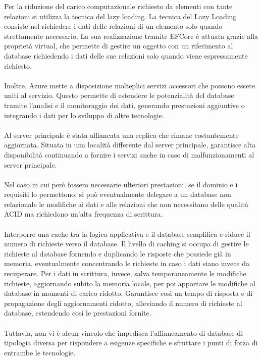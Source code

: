 Per la riduzione del carico computazionale richiesto da elementi con tante relazioni si utilizza la tecnica del lazy loading.
La tecnica del Lazy Loading consiste nel richiedere i dati delle relazioni di un elemento solo quando strettamente necessario.
La sua realizzazione tramite EFCore è attuata grazie alla proprietà virtual,
che permette di gestire un oggetto con un riferimento al database richiedendo i dati delle sue relazioni solo quando viene espressamente richiesto.\\
\\


Inoltre, Azure mette a disposizione molteplici servizi accessori che possono essere uniti al servizio.
Questo permette di estendere le potenzialità del database tramite  l’analisi e il monitoraggio dei dati,
generando prestazioni aggiuntive o integrando i dati per lo sviluppo di altre tecnologie.\\
\\

Al server principale è stata affiancata una replica che rimane costantemente aggiornata.
Situata in una località differente dal server principale,
garantisce alta disponibilità continuando a fornire i servizi anche in caso di malfunzionamenti al server principale.\\
\\

Nel caso in cui però fossero necessarie ulteriori prestazioni,
se il dominio e i requisiti lo permettono,
si può eventualmente delegare a un database non relazionale le modifiche ai dati e alle relazioni
che non necessitano delle qualità ACID ma richiedono un’alta frequenza di scrittura.\\
\\
Interporre una cache tra la logica applicativa e il database
semplifica e riduce il numero di richieste verso il database.
Il livello di caching si occupa di gestire le richieste al database
fornendo e duplicando le risposte che possiede già in memoria,
eventualmente concentrando le richieste in caso i dati siano invece da recuperare.
Per i dati in scrittura, invece, salva temporaneamente le modifiche richieste,
aggiornando subito la memoria locale,
per poi apportare le modifiche al database in momenti di carico ridotto.
Garantisce così un tempo di risposta e di propagazione degli aggiornamenti ridotto,
alleviando il numero di richieste al database, estendendo così  le prestazioni fornite.\\
\\


Tuttavia, non vi è alcun vincolo che impedisca l'affiancamento di database di tipologia diversa
per rispondere a esigenze specifiche e sfruttare i punti di forza di entrambe le tecnologie.
\\
\clearpage